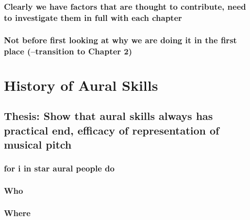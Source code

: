 \documentclass[]{book}
\theoremstyle{definition}
\theoremstyle{definition}
\theoremstyle{definition}
\theoremstyle{remark}
\begin{document}
\hypertarget{clearly-we-have-factors-that-are-thought-to-contribute-need-to-investigate-them-in-full-with-each-chapter}{%
\subsection{Clearly we have factors that are thought to contribute, need
to investigate them in full with each
chapter}\label{clearly-we-have-factors-that-are-thought-to-contribute-need-to-investigate-them-in-full-with-each-chapter}}

\hypertarget{not-before-first-looking-at-why-we-are-doing-it-in-the-first-place-transition-to-chapter-2}{%
\subsection{Not before first looking at why we are doing it in the first
place (--transition to Chapter
2)}\label{not-before-first-looking-at-why-we-are-doing-it-in-the-first-place-transition-to-chapter-2}}

\hypertarget{history-of-aural-skills}{%
\chapter{History of Aural Skills}\label{history-of-aural-skills}}

\hypertarget{thesis-show-that-aural-skills-always-has-practical-end-efficacy-of-representation-of-musical-pitch}{%
\section{Thesis: Show that aural skills always has practical end,
efficacy of representation of musical
pitch}\label{thesis-show-that-aural-skills-always-has-practical-end-efficacy-of-representation-of-musical-pitch}}

\hypertarget{for-i-in-star-aural-people-do}{%
\subsection{for i in star aural people
do}\label{for-i-in-star-aural-people-do}}

\hypertarget{who}{%
\subsection{Who}\label{who}}

\hypertarget{where}{%
\subsection{Where}\label{where}}
\end{document}
